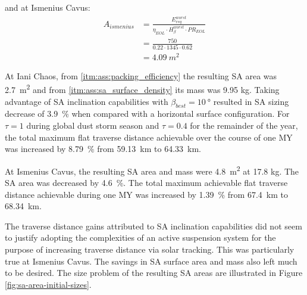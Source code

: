 and at Ismenius Cavus:
\begin{align}
  \label{calc:solar_cell_area_ismenius_cavus_traverse}
  A_{ismenius} &= \frac{E_{req}^{worst}}{\eta_{EOL} \cdot H_{\beta}^{worst} \cdot PR_{EOL}}\\
               &= \frac{750}{0.22 \cdot 1345 \cdot 0.62}\\
               &= \SI{4.09}{m^{2}}
\end{align}

At Iani Chaos, from \ref{itm:ass:packing_efficiency} the resulting \ac{SA} area was \SI{2.7}{m^{2}} and from \ref{itm:ass:sa_surface_density} its mass was 9.95 \si{\kilo\gram}. Taking advantage of \ac{SA} inclination capabilities with $\beta_{best} = \SI{10}{\degree}$ resulted in \ac{SA} sizing decrease of \SI{3.9}{\percent} when compared with a horizontal surface configuration. For $\tau = 1$ during global dust storm season and $\tau = 0.4$ for the remainder of the year, the total maximum flat traverse distance achievable over the course of one \ac{MY} was increased by \SI{8.79}{\percent} from \SI{59.13}{\kilo\meter} to \SI{64.33}{\kilo\meter}.

At Ismenius Cavus, the resulting \ac{SA} area and mass were \SI{4.8}{m^{2}} at 17.8 \si{\kilo\gram}. The \ac{SA} area was decreased by \SI{4.6}{\percent}. The total maximum achievable flat traverse distance achievable during one \ac{MY} was increased by \SI{1.39}{\percent} from \SI{67.4}{\kilo\meter} to \SI{68.34}{\kilo\meter}.

The traverse distance gains attributed to \ac{SA} inclination capabilities did not seem to justify adopting the complexities of an active suspension system for the purpose of increasing traverse distance via solar tracking. This was particularly true at Ismenius Cavus. The savings in \ac{SA} surface area and mass also left much to be desired. The size problem of the resulting \ac{SA} areas are illustrated in Figure \ref{fig:sa-area-initial-sizes}.

